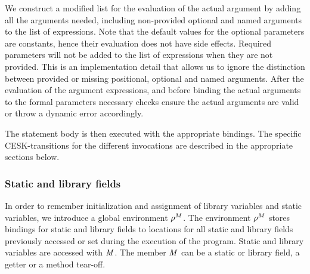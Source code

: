 \documentclass[a4paper,oneside]{article}
\begin{document}
We construct a modified list for the evaluation of the actual argument by adding all the arguments needed, including non-provided optional and named arguments to the list of expressions.
Note that the default values for the optional parameters are constants, hence their evaluation does not have side effects.
Required parameters will not be added to the list of expressions when they are not provided.
This is an implementation detail that allows us to ignore the distinction between provided or missing positional, optional and named arguments.
After the evaluation of the argument expressions, and before binding the actual arguments to the formal parameters necessary checks ensure the actual arguments are valid or throw a dynamic error accordingly.

The statement body is then executed with the appropriate bindings.
The specific CESK-transitions for the different invocations are described in the appropriate sections below.


\subsubsection{Static and library fields}
\label{subsubsec:static-and-library-fields}

In order to remember initialization and assignment of library variables and static variables, we introduce a global environment $\rho^{M}$.
The environment $\rho^{M}$ stores bindings for static and library fields to locations for all static and library fields previously accessed or set during the execution of the program.
Static and library variables are accessed with $\mathit{M}$.
The member $\mathit{M}$ can be a static or library field, a getter or a method tear-off.
\end{document}
